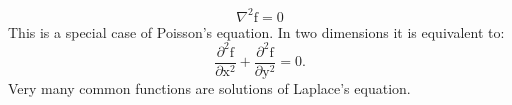 \[ \nabla ^2 \mathrm{f} = 0 \]
This is a special case of Poisson's equation. In two dimensions it is equivalent 
to: \[ \frac{\partial ^2 \mathrm{f}}{\partial \mathrm{x} ^2 } 
+ \frac{\partial ^2 \mathrm{f}}{\partial \mathrm{y} ^2 } =0 . \]
Very many common functions are solutions of Laplace's equation.